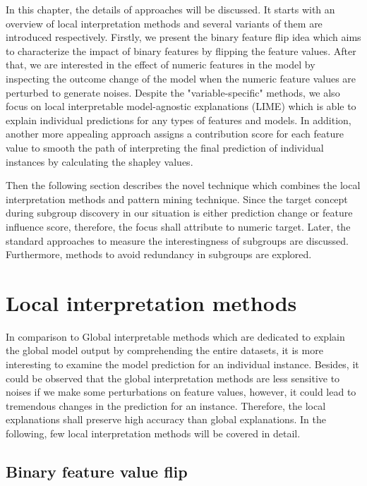 In this chapter, the details of approaches will be discussed. It starts with an overview of local interpretation methods and several variants of them are introduced respectively. Firstly, we present the binary feature flip idea which aims to characterize the impact of binary features by flipping the feature values. After that, we are interested in the effect of numeric features in the model by inspecting the outcome change of the model when the numeric feature values are perturbed to generate noises. Despite the "variable-specific" methods, we also focus on local interpretable model-agnostic explanations (LIME) which is able to explain individual predictions for any types of features and models. In addition, another more appealing approach assigns a contribution score for each feature value to smooth the path of interpreting the final prediction of individual instances by calculating the shapley values. 

Then the following section describes the novel technique which combines the local interpretation methods and pattern mining technique. Since the target concept during subgroup discovery in our situation is either prediction change or feature influence score, therefore, the focus shall attribute to numeric target. Later, the standard approaches to measure the interestingness of subgroups are discussed. Furthermore, methods to avoid redundancy in subgroups are explored. 

\section{Local interpretation methods}

In comparison to Global interpretable methods which are dedicated to explain the global model output by comprehending the entire datasets, it is more interesting to examine the model prediction for an individual instance. Besides, it could be observed that the global interpretation methods are less sensitive to noises if we make some perturbations on feature values, however, it could lead to tremendous changes in the prediction for an instance. Therefore, the local explanations shall preserve high accuracy than global explanations. In the following, few local interpretation methods will be covered in detail. 

\subsection{Binary feature value flip}

